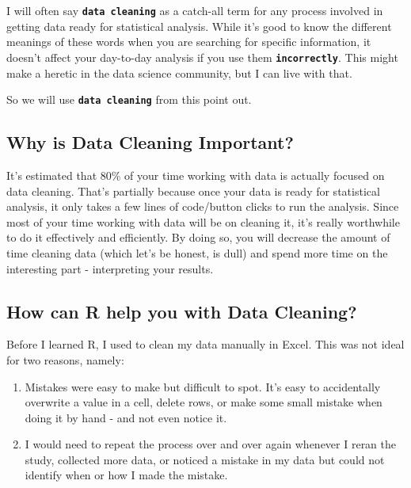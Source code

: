 \documentclass[
]{book}
\begin{document}
I will often say \textbf{\texttt{data\ cleaning}} as a catch-all term for any process involved in getting data ready for statistical analysis. While it's good to know the different meanings of these words when you are searching for specific information, it doesn't affect your day-to-day analysis if you use them \textbf{\texttt{incorrectly}}. This might make a heretic in the data science community, but I can live with that.

So we will use \textbf{\texttt{data\ cleaning}} from this point out.

\hypertarget{why-is-data-cleaning-important}{%
\subsection{\texorpdfstring{\textbf{Why is Data Cleaning Important?}}{Why is Data Cleaning Important?}}\label{why-is-data-cleaning-important}}

It's estimated that 80\% of your time working with data is actually focused on data cleaning. That's partially because once your data is ready for statistical analysis, it only takes a few lines of code/button clicks to run the analysis. Since most of your time working with data will be on cleaning it, it's really worthwhile to do it effectively and efficiently. By doing so, you will decrease the amount of time cleaning data (which let's be honest, is dull) and spend more time on the interesting part - interpreting your results.

\hypertarget{how-can-r-help-you-with-data-cleaning}{%
\subsection{\texorpdfstring{\textbf{How can R help you with Data Cleaning?}}{How can R help you with Data Cleaning?}}\label{how-can-r-help-you-with-data-cleaning}}

Before I learned R, I used to clean my data manually in Excel. This was not ideal for two reasons, namely:

\begin{enumerate}
\def\labelenumi{\arabic{enumi}.}
\item
  Mistakes were easy to make but difficult to spot. It's easy to accidentally overwrite a value in a cell, delete rows, or make some small mistake when doing it by hand - and not even notice it.
\item
  I would need to repeat the process over and over again whenever I reran the study, collected more data, or noticed a mistake in my data but could not identify when or how I made the mistake.
\end{enumerate}
\end{document}
